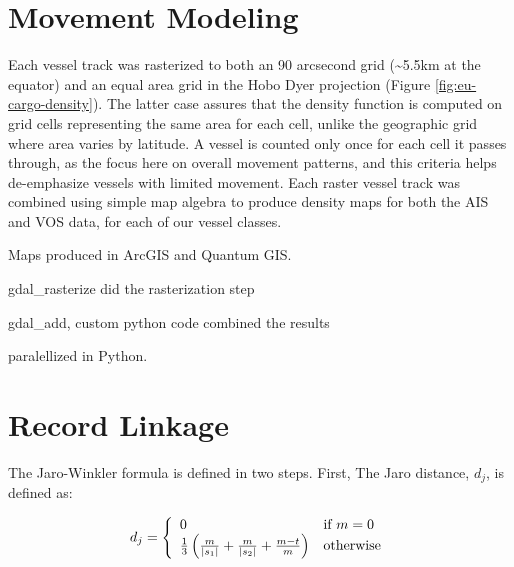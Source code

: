 
\chapter{Movement Modeling}
\label{sec:movement-modeling-appendix}

Each vessel track was rasterized to both an 90 arcsecond grid (\textasciitilde{}5.5km at the equator) and an equal area grid in the Hobo Dyer projection (Figure \ref{fig:eu-cargo-density}). The latter case assures that the density function is computed on grid cells representing the same area for each cell, unlike the geographic grid where area varies by latitude. A vessel is counted only once for each cell it passes through, as the focus here on overall movement patterns, and this criteria helps de-emphasize vessels with limited movement. Each raster vessel track was combined using simple map algebra to produce density maps for both the AIS and VOS data, for each of our vessel classes. %

Maps produced in ArcGIS and Quantum GIS.

gdal_rasterize did the rasterization step

gdal_add, custom python code combined the results

paralellized in Python.




\chapter{Record Linkage}
\label{sec:record-linkage-appendix}

The Jaro-Winkler formula is defined in two steps. First, The Jaro distance, $d_j $, is defined as:


\begin{equation}
  d_j = \left\{
  \begin{array}{l l}
    0 & \text{if }m = 0 \\ 
    \frac{1}{3}\left(\frac{m}{|s_1|} + \frac{m}{|s_2|} + \frac{m-t}{m}\right) & \text{otherwise} \end{array} \right.
\end{equation}


